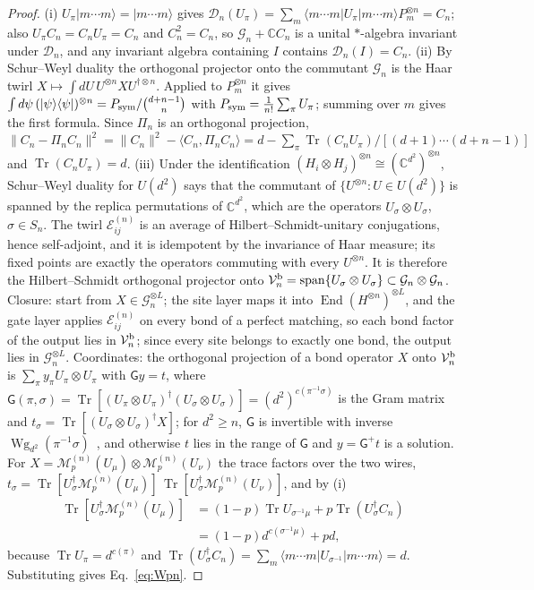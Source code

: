 \documentclass[aps,prx,reprint,superscriptaddress,nobibnotes,longbibliography]{revtex4-2}
\theoremstyle{remark}
\newcommand{\Tr}{\operatorname{Tr}}
\newcommand{\Wg}{\operatorname{Wg}}
\begin{document}
\begin{proof}
(i) $U_\pi|m\cdots m\rangle=|m\cdots m\rangle$ gives $\mathcal D_n(U_\pi)=\sum_m\langle m\cdots m|U_\pi|m\cdots m\rangle P_m^{\otimes n}=C_n$; also $U_\pi C_n=C_nU_\pi=C_n$ and $C_n^2=C_n$, so $\mathcal G_n+\mathbb CC_n$ is a unital $*$-algebra invariant under $\mathcal D_n$, and any invariant algebra containing $I$ contains $\mathcal D_n(I)=C_n$.
(ii) By Schur--Weyl duality the orthogonal projector onto the commutant $\mathcal G_n$ is the Haar twirl $X\mapsto\int dU\,U^{\otimes n}XU^{\dagger\otimes n}$.  Applied to $P_m^{\otimes n}$ it gives $\int d\psi\,(|\psi\rangle\langle\psi|)^{\otimes n}=P_{\rm sym}/\binom{d+n-1}{n}$ with $P_{\rm sym}=\frac1{n!}\sum_\pi U_\pi$; summing over $m$ gives the first formula.  Since $\Pi_n$ is an orthogonal projection, $\|C_n-\Pi_nC_n\|^2=\|C_n\|^2-\langle C_n,\Pi_nC_n\rangle=d-\sum_\pi\Tr(C_nU_\pi)/[(d+1)\cdots(d+n-1)]$ and $\Tr(C_nU_\pi)=d$.
(iii) Under the identification $(H_i\otimes H_j)^{\otimes n}\cong(\mathbb C^{d^2})^{\otimes n}$, Schur--Weyl duality for $U(d^2)$ says that the commutant of $\{U^{\otimes n}:U\in U(d^2)\}$ is spanned by the replica permutations of $\mathbb C^{d^2}$, which are the operators $U_\sigma\otimes U_\sigma$, $\sigma\in S_n$.  The twirl $\mathcal E^{(n)}_{ij}$ is an average of Hilbert--Schmidt-unitary conjugations, hence self-adjoint, and it is idempotent by the invariance of Haar measure; its fixed points are exactly the operators commuting with every $U^{\otimes n}$.  It is therefore the Hilbert--Schmidt orthogonal projector onto $\mathcal V_n^{\rm b}=\operatorname{span}\{U_\sigma\otimes U_\sigma\}\subset\mathcal G_n\otimes\mathcal G_n$.  Closure: start from $X\in\mathcal G_n^{\otimes L}$; the site layer maps it into $\operatorname{End}(H^{\otimes n})^{\otimes L}$, and the gate layer applies $\mathcal E^{(n)}_{ij}$ on every bond of a perfect matching, so each bond factor of the output lies in $\mathcal V_n^{\rm b}$; since every site belongs to exactly one bond, the output lies in $\mathcal G_n^{\otimes L}$.  Coordinates: the orthogonal projection of a bond operator $X$ onto $\mathcal V_n^{\rm b}$ is $\sum_\pi y_\pi U_\pi\otimes U_\pi$ with $\mathsf Gy=t$, where $\mathsf G(\pi,\sigma)=\Tr[(U_\pi\otimes U_\pi)^\dagger(U_\sigma\otimes U_\sigma)]=(d^2)^{c(\pi^{-1}\sigma)}$ is the Gram matrix and $t_\sigma=\Tr[(U_\sigma\otimes U_\sigma)^\dagger X]$; for $d^2\ge n$, $\mathsf G$ is invertible with inverse $\Wg_{d^2}(\pi^{-1}\sigma)$~\cite{Collins2003,CollinsSniady2006}, and otherwise $t$ lies in the range of $\mathsf G$ and $y=\mathsf G^+t$ is a solution.  For $X=\mathcal M_p^{(n)}(U_\mu)\otimes\mathcal M_p^{(n)}(U_\nu)$ the trace factors over the two wires, $t_\sigma=\Tr[U_\sigma^\dagger\mathcal M_p^{(n)}(U_\mu)]\,\Tr[U_\sigma^\dagger\mathcal M_p^{(n)}(U_\nu)]$, and by (i)
\begin{align*}
 \Tr[U_\sigma^\dagger\mathcal M_p^{(n)}(U_\mu)]&=(1-p)\Tr U_{\sigma^{-1}\mu}+p\Tr(U_\sigma^\dagger C_n)\\
 &=(1-p)d^{c(\sigma^{-1}\mu)}+pd,
\end{align*}
because $\Tr U_\pi=d^{c(\pi)}$ and $\Tr(U_\sigma^\dagger C_n)=\sum_m\langle m\cdots m|U_{\sigma^{-1}}|m\cdots m\rangle=d$.  Substituting gives Eq.~\eqref{eq:Wpn}.
\end{proof}
\end{document}
